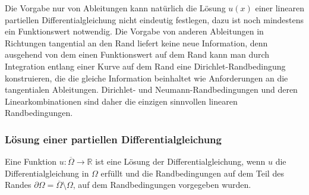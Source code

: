 Die Vorgabe nur von Ableitungen kann natürlich die Lösung $u(x)$
einer linearen partiellen Differentialgleichung nicht eindeutig
festlegen, dazu ist noch mindestens ein Funktionswert notwendig.
Die Vorgabe von anderen Ableitungen in Richtungen tangential an den
Rand liefert keine neue Information, denn ausgehend von dem einen
Funktionswert auf dem Rand kann man durch Integration entlang
einer Kurve auf dem Rand eine Dirichlet-Randbedingung konstruieren,
die die gleiche Information beinhaltet wie Anforderungen an die
tangentialen Ableitungen.
Dirichlet- und Neumann-Randbedingungen und deren Linearkombinationen
sind daher die einzigen sinnvollen linearen Randbedingungen.

\subsubsection{Lösung einer partiellen Differentialgleichung}
Eine Funktion $u\colon \overline{\Omega}\to\mathbb{R}$ ist
eine Lösung der Differentialgleichung, wenn $u$ die
Differentialgleichung in $\Omega$ erfüllt und die
Randbedingungen auf dem Teil des Randes
$\partial \Omega=\overline{\Omega}\setminus \Omega$,
auf dem Randbedingungen vorgegeben wurden.

